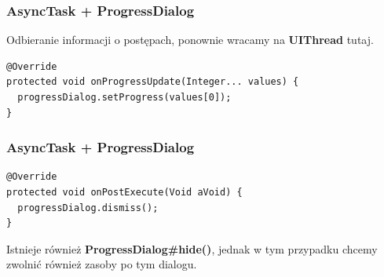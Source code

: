 \documentclass{beamer}
\begin{document}
\begin{frame}[fragile]\frametitle{AsyncTask + ProgressDialog}
Odbieranie informacji o postępach, ponownie wracamy na \textbf{UIThread} tutaj.
\begin{lstlisting}
@Override
protected void onProgressUpdate(Integer... values) {
  progressDialog.setProgress(values[0]);
}
\end{lstlisting}
\end{frame}

\begin{frame}[fragile]\frametitle{AsyncTask + ProgressDialog}
\begin{lstlisting}
@Override
protected void onPostExecute(Void aVoid) {
  progressDialog.dismiss();
}
\end{lstlisting}
Istnieje również \textbf{ProgressDialog\#hide()}, jednak w tym 
przypadku chcemy zwolnić również zasoby po tym dialogu.
\end{frame}
\end{document}
